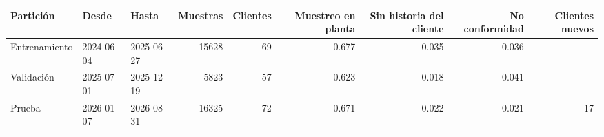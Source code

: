 \begin{tabular}{lllrrrrrr}
\toprule
Partición & Desde & Hasta & Muestras & Clientes & Muestreo en planta & Sin historia del cliente & No conformidad & Clientes nuevos \\
\midrule
Entrenamiento & 2024-06-04 & 2025-06-27 & 15628 & 69 & 0.677 & 0.035 & 0.036 & --- \\
Validación & 2025-07-01 & 2025-12-19 & 5823 & 57 & 0.623 & 0.018 & 0.041 & --- \\
Prueba & 2026-01-07 & 2026-08-31 & 16325 & 72 & 0.671 & 0.022 & 0.021 & 17 \\
\bottomrule
\end{tabular}
